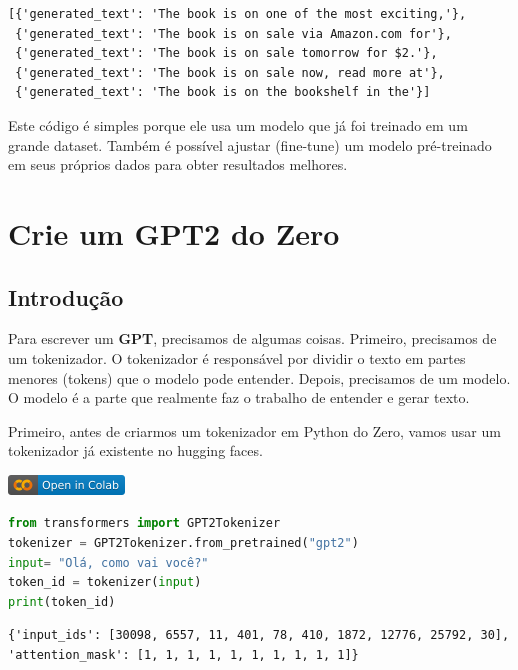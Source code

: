 \documentclass[14pt,a4paper,oneside]{book}
\begin{document}
\begin{lstlisting}
[{'generated_text': 'The book is on one of the most exciting,'},
 {'generated_text': 'The book is on sale via Amazon.com for'}, 
 {'generated_text': 'The book is on sale tomorrow for $2.'}, 
 {'generated_text': 'The book is on sale now, read more at'}, 
 {'generated_text': 'The book is on the bookshelf in the'}]
\end{lstlisting}

Este código é simples porque ele usa um modelo que já foi treinado em um grande dataset. Também é possível ajustar (fine-tune) um modelo pré-treinado em seus próprios dados para obter resultados melhores.


\chapter{Crie um GPT2 do Zero}

\section{Introdução}

Para escrever um \textbf{GPT}, precisamos de algumas coisas. 
Primeiro, precisamos de um tokenizador. O tokenizador é responsável por dividir o texto em partes menores (tokens) que o modelo pode entender. Depois, precisamos de um modelo. O modelo é a parte que realmente faz o trabalho de entender e gerar texto.

Primeiro, antes de criarmos um tokenizador em Python do Zero, vamos usar um tokenizador já existente no hugging faces.

\vspace{\baselineskip}
\href{https://colab.research.google.com/github/giseldo/chatbotbook/blob/main/notebook/cap13.ipynb}{
  \includegraphics{./fig/colab-badge.png}
}

\begin{lstlisting}[language=Python, caption=Usando o tokenizador do GPT-2, label=lst:usando_tokenizer_gpt2]
from transformers import GPT2Tokenizer
tokenizer = GPT2Tokenizer.from_pretrained("gpt2")
input= "Olá, como vai você?"	
token_id = tokenizer(input)
print(token_id)
\end{lstlisting}

\begin{lstlisting}
{'input_ids': [30098, 6557, 11, 401, 78, 410, 1872, 12776, 25792, 30], 'attention_mask': [1, 1, 1, 1, 1, 1, 1, 1, 1, 1]}
\end{lstlisting}
\end{document}
